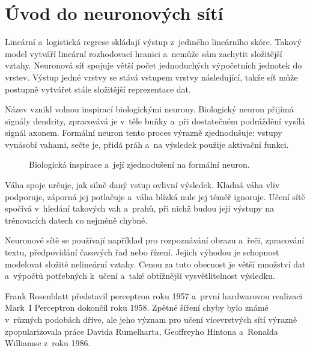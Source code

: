 \section{Úvod do neuronových sítí}\label{sec:ai-uvod-neuronove-site}

Lineární a~logistická regrese skládají výstup z~jediného lineárního skóre. Takový model vytváří lineární rozhodovací hranici a~nemůže sám zachytit složitější vztahy. Neuronová síť spojuje větší počet jednoduchých výpočetních jednotek do vrstev. Výstup jedné vrstvy se stává vstupem vrstvy následující, takže síť může postupně vytvářet stále složitější reprezentace dat.

Název vznikl volnou inspirací biologickými neurony. Biologický neuron přijímá signály dendrity, zpracovává je v~těle buňky a~při dostatečném podráždění vysílá signál axonem. Formální neuron tento proces výrazně zjednodušuje: vstupy vynásobí vahami, sečte je, přidá práh a~na výsledek použije aktivační funkci.

\begin{figure}[ht]
    \centering
    
    \caption{Biologická inspirace a~její zjednodušení na formální neuron.}
    \label{fig:ai-biologicky-formalni}
\end{figure}


Váha spoje určuje, jak silně daný vstup ovlivní výsledek. Kladná váha vliv podporuje, záporná jej potlačuje a~váha blízká nule jej téměř ignoruje. Učení sítě spočívá v~hledání takových vah a~prahů, při nichž budou její výstupy na trénovacích datech co nejméně chybné.

Neuronové sítě se používají například pro rozpoznávání obrazu a~řeči, zpracování textu, předpovídání časových řad nebo řízení. Jejich výhodou je schopnost modelovat složité nelineární vztahy. Cenou za tuto obecnost je větší množství dat a~výpočtů potřebných k~učení a~také obtížnější vysvětlitelnost výsledku.

\begin{remark}
    Frank Rosenblatt představil perceptron roku 1957 a~první hardwarovou realizaci Mark~I Perceptron dokončil roku 1958. Zpětné šíření chyby bylo známé v~různých podobách dříve, ale jeho význam pro učení vícevrstvých sítí výrazně zpopularizovala práce Davida Rumelharta, Geoffreyho Hintona a~Ronalda Williamse z~roku 1986.
\end{remark}
